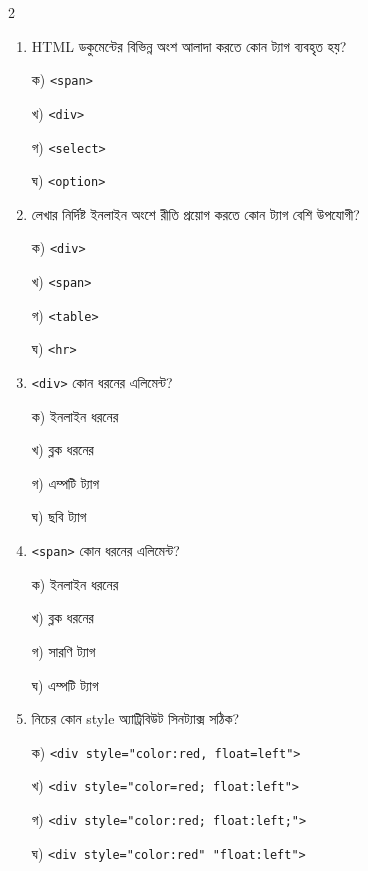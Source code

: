 \begin{multicols}{2}
\begin{enumerate}[leftmargin=*,itemsep=5pt]
\item \begin{minipage}[t]{\linewidth}\vspace{0pt}
HTML ডকুমেন্টের বিভিন্ন অংশ আলাদা করতে কোন ট্যাগ ব্যবহৃত হয়?
\par ক) \texttt{<span>}
\par খ) \texttt{<div>}
\par গ) \texttt{<select>}
\par ঘ) \texttt{<option>}
\end{minipage}

\item \begin{minipage}[t]{\linewidth}\vspace{0pt}
লেখার নির্দিষ্ট ইনলাইন অংশে রীতি প্রয়োগ করতে কোন ট্যাগ বেশি উপযোগী?
\par ক) \texttt{<div>}
\par খ) \texttt{<span>}
\par গ) \texttt{<table>}
\par ঘ) \texttt{<hr>}
\end{minipage}

\item \begin{minipage}[t]{\linewidth}\vspace{0pt}
\texttt{<div>} কোন ধরনের এলিমেন্ট?
\par ক) ইনলাইন ধরনের
\par খ) ব্লক ধরনের
\par গ) এম্পটি ট্যাগ
\par ঘ) ছবি ট্যাগ
\end{minipage}

\item \begin{minipage}[t]{\linewidth}\vspace{0pt}
\texttt{<span>} কোন ধরনের এলিমেন্ট?
\par ক) ইনলাইন ধরনের
\par খ) ব্লক ধরনের
\par গ) সারণি ট্যাগ
\par ঘ) এম্পটি ট্যাগ
\end{minipage}

\item \begin{minipage}[t]{\linewidth}\vspace{0pt}
নিচের কোন style অ্যাট্রিবিউট সিনট্যাক্স সঠিক?
\par ক) \texttt{<div style="color:red, float=left">}
\par খ) \texttt{<div style="color=red; float:left">}
\par গ) \texttt{<div style="color:red; float:left;">}
\par ঘ) \texttt{<div style="color:red" "float:left">}
\end{minipage}


\end{enumerate}
\end{multicols}
